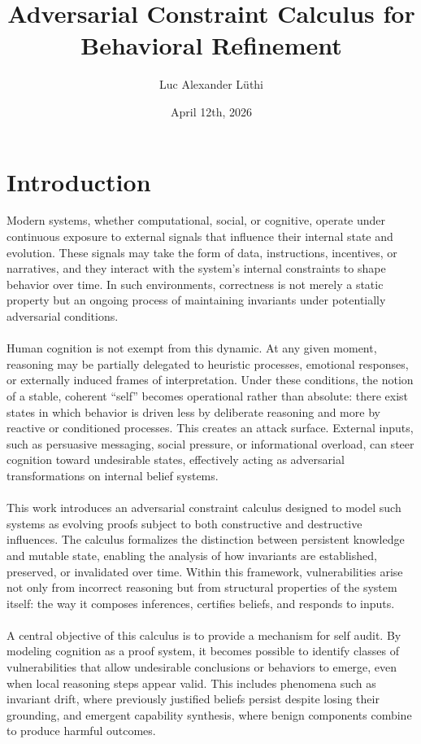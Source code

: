 \documentclass{article}
\title{Adversarial Constraint Calculus for Behavioral Refinement}
\author{Luc Alexander L{\"u}thi}
\date{April 12th, 2026}
\begin{document}
	\maketitle
	\tableofcontents
	\section{Introduction}
	Modern systems, whether computational, social, or cognitive, operate under continuous exposure to external signals that influence their internal state and evolution. These signals may take the form of data, instructions, incentives, or narratives, and they interact with the system’s internal constraints to shape behavior over time. In such environments, correctness is not merely a static property but an ongoing process of maintaining invariants under potentially adversarial conditions.\\\\
	Human cognition is not exempt from this dynamic. At any given moment, reasoning may be partially delegated to heuristic processes, emotional responses, or externally induced frames of interpretation. Under these conditions, the notion of a stable, coherent “self” becomes operational rather than absolute: there exist states in which behavior is driven less by deliberate reasoning and more by reactive or conditioned processes. This creates an attack surface. External inputs, such as persuasive messaging, social pressure, or informational overload, can steer cognition toward undesirable states, effectively acting as adversarial transformations on internal belief systems.\\\\
	This work introduces an adversarial constraint calculus designed to model such systems as evolving proofs subject to both constructive and destructive influences. The calculus formalizes the distinction between persistent knowledge and mutable state, enabling the analysis of how invariants are established, preserved, or invalidated over time. Within this framework, vulnerabilities arise not only from incorrect reasoning but from structural properties of the system itself: the way it composes inferences, certifies beliefs, and responds to inputs.\\\\
	A central objective of this calculus is to provide a mechanism for self audit. By modeling cognition as a proof system, it becomes possible to identify classes of vulnerabilities that allow undesirable conclusions or behaviors to emerge, even when local reasoning steps appear valid. This includes phenomena such as invariant drift, where previously justified beliefs persist despite losing their grounding, and emergent capability synthesis, where benign components combine to produce harmful outcomes.\\\\
\end{document}
